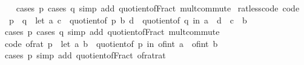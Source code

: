 \begin{isabellebody}
%
\isadelimproof
\ \ %
\endisadelimproof
%
\isatagproof
{}\isamarkupfalse%
\ {\isacharparenleft}{\kern0pt}cases\ p{\isacharcomma}{\kern0pt}\ cases\ q{\isacharparenright}{\kern0pt}\ {\isacharparenleft}{\kern0pt}simp\ add{\isacharcolon}{\kern0pt}\ quotient{\isacharunderscore}{\kern0pt}of{\isacharunderscore}{\kern0pt}Fract\ mult{\isachardot}{\kern0pt}commute{\isacharparenright}{\kern0pt}%
\endisatagproof
{\isafoldproof}%
%
\isadelimproof
\isanewline
%
\endisadelimproof
\isanewline
{}\isamarkupfalse%
\ rat{\isacharunderscore}{\kern0pt}less{\isacharunderscore}{\kern0pt}code\ {\isacharbrackleft}{\kern0pt}code{\isacharbrackright}{\kern0pt}{\isacharcolon}{\kern0pt}\isanewline
\ \ {\isachardoublequoteopen}p\ {\isacharless}{\kern0pt}\ q\ {\isasymlongleftrightarrow}\ {\isacharparenleft}{\kern0pt}let\ {\isacharparenleft}{\kern0pt}a{\isacharcomma}{\kern0pt}\ c{\isacharparenright}{\kern0pt}\ {\isacharequal}{\kern0pt}\ quotient{\isacharunderscore}{\kern0pt}of\ p{\isacharsemicolon}{\kern0pt}\ {\isacharparenleft}{\kern0pt}b{\isacharcomma}{\kern0pt}\ d{\isacharparenright}{\kern0pt}\ {\isacharequal}{\kern0pt}\ quotient{\isacharunderscore}{\kern0pt}of\ q\ in\ a\ {\isacharasterisk}{\kern0pt}\ d\ {\isacharless}{\kern0pt}\ c\ {\isacharasterisk}{\kern0pt}\ b{\isacharparenright}{\kern0pt}{\isachardoublequoteclose}\isanewline
%
\isadelimproof
\ \ %
\endisadelimproof
%
\isatagproof
{}\isamarkupfalse%
\ {\isacharparenleft}{\kern0pt}cases\ p{\isacharcomma}{\kern0pt}\ cases\ q{\isacharparenright}{\kern0pt}\ {\isacharparenleft}{\kern0pt}simp\ add{\isacharcolon}{\kern0pt}\ quotient{\isacharunderscore}{\kern0pt}of{\isacharunderscore}{\kern0pt}Fract\ mult{\isachardot}{\kern0pt}commute{\isacharparenright}{\kern0pt}%
\endisatagproof
{\isafoldproof}%
%
\isadelimproof
\isanewline
%
\endisadelimproof
\isanewline
{}\isamarkupfalse%
\ {\isacharbrackleft}{\kern0pt}code{\isacharbrackright}{\kern0pt}{\isacharcolon}{\kern0pt}\ {\isachardoublequoteopen}of{\isacharunderscore}{\kern0pt}rat\ p\ {\isacharequal}{\kern0pt}\ {\isacharparenleft}{\kern0pt}let\ {\isacharparenleft}{\kern0pt}a{\isacharcomma}{\kern0pt}\ b{\isacharparenright}{\kern0pt}\ {\isacharequal}{\kern0pt}\ quotient{\isacharunderscore}{\kern0pt}of\ p\ in\ of{\isacharunderscore}{\kern0pt}int\ a\ {\isacharslash}{\kern0pt}\ of{\isacharunderscore}{\kern0pt}int\ b{\isacharparenright}{\kern0pt}{\isachardoublequoteclose}\isanewline
%
\isadelimproof
\ \ %
\endisadelimproof
%
\isatagproof
{}\isamarkupfalse%
\ {\isacharparenleft}{\kern0pt}cases\ p{\isacharparenright}{\kern0pt}\ {\isacharparenleft}{\kern0pt}simp\ add{\isacharcolon}{\kern0pt}\ quotient{\isacharunderscore}{\kern0pt}of{\isacharunderscore}{\kern0pt}Fract\ of{\isacharunderscore}{\kern0pt}rat{\isacharunderscore}{\kern0pt}rat{\isacharparenright}{\kern0pt}%

\end{isabellebody}
